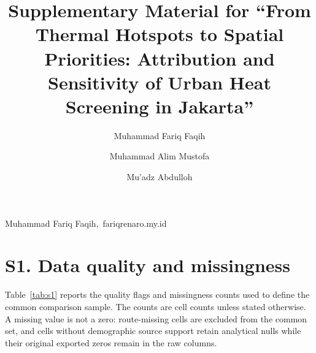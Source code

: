 \documentclass[times,twoside]{_Templates/MultiTargetManuscript}
\begin{document}
\onecolumn
\raggedbottom

\title{Supplementary Material for ``From Thermal Hotspots to Spatial Priorities: Attribution and Sensitivity of Urban Heat Screening in Jakarta''}
\author[1]{Muhammad Fariq Faqih}
\author[1]{Muhammad Alim Mustofa}
\author[1]{Mu'adz Abdulloh}


\maketitle

\begin{corrauthor}
Muhammad Fariq Faqih,\ fariq\at renaro.my.id
\end{corrauthor}

\section*{S1. Data quality and missingness}

Table~\ref{tab:s1} reports the quality flags and missingness counts used to
define the common comparison sample. The counts are cell counts unless stated
otherwise. A missing value is not a zero: route-missing cells are excluded from
the common set, and cells without demographic source support retain analytical
nulls while their original exported zeros remain in the raw columns.
\end{document}
